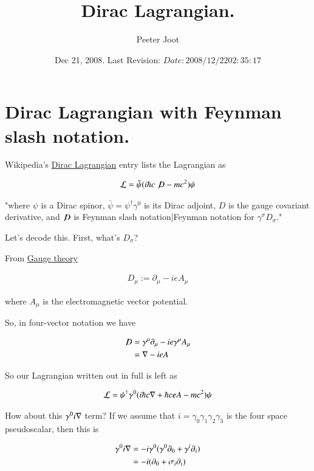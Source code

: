 \documentclass{article}
\title{ Dirac Lagrangian. }
\author{Peeter Joot}
\date{ Dec 21, 2008.  Last Revision: $Date: 2008/12/22 02:35:17 $ }
\newcommand{\Dslash}[0]{ \not\!D }
\begin{document}
\maketitle{}


\section{ Dirac Lagrangian with Feynman slash notation. }

Wikipedia's \href{http://en.wikipedia.org/wiki/Lagrangian#Dirac_Lagrangian}{Dirac Lagrangian} entry lists the Lagrangian as

\begin{align*}
\LL = \bar \psi (i \hbar c \Dslash - mc^2) \psi
\end{align*}

"where $\psi\!$ is a Dirac spinor, $\bar \psi = \psi^\dagger \gamma^0$ is its Dirac adjoint, $D\!$ is the gauge covariant derivative, and $\Dslash$ is Feynman slash notation|Feynman notation for $\gamma^\sigma D_\sigma\!$."

Let's decode this.  First, what's $D_\sigma$?

From \href{http://en.wikipedia.org/wiki/Gauge_covariant_derivative}{Gauge theory}

\begin{align*}
D_\mu := \partial_\mu - i e A_\mu
\end{align*}

where $A_\mu$ is the electromagnetic vector potential.

So, in four-vector notation we have

\begin{align*}
\Dslash 
&= \gamma^\mu \partial_\mu - i e \gamma^\mu A_\mu \\
&= \grad - i e A \\
\end{align*}

So our Lagrangian written out in full is left as

\begin{align}\label{eqn:lag1}
\mathcal{L} = \psi^\dagger \gamma^0 ( i \hbar c \nabla + \hbar c e A - mc^2) \psi
\end{align}

How about this $\gamma^0 i \nabla$ term?  If we assume that $i = \gamma_0 \gamma_1 \gamma_2 \gamma_3$ is the four space pseudoscalar, then this is

\begin{align*}
\gamma^0 i \nabla
&= - i \gamma^0 (\gamma^0 \partial_0 + \gamma^i \partial_i) \\
&= - i (\partial_0 + \sigma_i \partial_i) \\
\end{align*}
\end{document}
